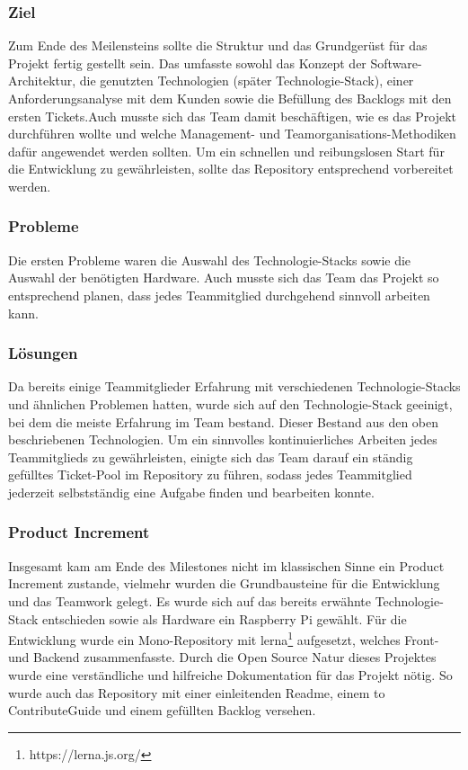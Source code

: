 \documentclass[10pt, a4paper, draft]{article}
\begin{document}
\subsubsection{Ziel}
Zum Ende des Meilensteins sollte die Struktur und das Grundgerüst für das Projekt fertig gestellt sein.
Das umfasste sowohl das Konzept der Software-Architektur, die genutzten Technologien (später Technologie-Stack), einer Anforderungsanalyse mit dem Kunden sowie die Befüllung des Backlogs mit den ersten Tickets.Auch musste sich das Team damit beschäftigen, wie es das Projekt durchführen wollte und welche Management- und Teamorganisations-Methodiken dafür angewendet werden sollten.
Um ein schnellen und reibungslosen  Start für die Entwicklung zu gewährleisten, sollte das Repository entsprechend vorbereitet werden.
\subsubsection{Probleme}
Die ersten Probleme waren die Auswahl des Technologie-Stacks sowie die Auswahl der benötigten Hardware.
Auch musste sich das Team das Projekt so entsprechend planen, dass jedes Teammitglied durchgehend sinnvoll arbeiten kann.
\subsubsection{Lösungen}
Da bereits einige Teammitglieder Erfahrung mit verschiedenen Technologie-Stacks und ähnlichen Problemen hatten, wurde sich auf den Technologie-Stack geeinigt, bei dem die meiste Erfahrung im Team bestand.
Dieser Bestand aus den oben beschriebenen Technologien.
Um ein sinnvolles kontinuierliches Arbeiten jedes Teammitglieds zu gewährleisten, einigte sich das Team darauf ein ständig gefülltes Ticket-Pool im Repository zu führen, sodass jedes Teammitglied jederzeit selbstständig eine Aufgabe finden und bearbeiten konnte.
\subsubsection{Product Increment}
Insgesamt kam am Ende des Milestones nicht im klassischen Sinne ein Product Increment zustande, vielmehr wurden die Grundbausteine für die Entwicklung und das Teamwork gelegt.
Es wurde sich auf das bereits erwähnte Technologie-Stack entschieden sowie als Hardware ein Raspberry Pi gewählt.
Für die Entwicklung wurde ein Mono-Repository mit lerna\footnote{https://lerna.js.org/} aufgesetzt, welches Front- und Backend zusammenfasste.
Durch die Open Source Natur dieses Projektes wurde eine verständliche und hilfreiche Dokumentation für das Projekt  nötig.
So wurde auch das Repository mit einer einleitenden Readme, einem \glqqHow to Contribute\grqq Guide und einem gefüllten Backlog versehen.
\end{document}
